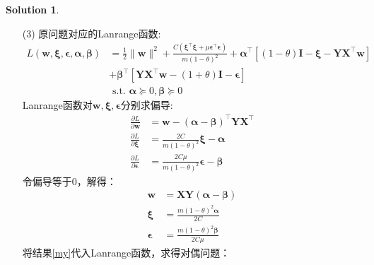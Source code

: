 \documentclass[a4paper,UTF8]{article}
\numberwithin{equation}{section}
\theoremstyle{definition}
\newtheorem*{solution}{Solution}
\begin{document}
\begin{solution}
\begin{enumerate}
        \item [(3)]
        原问题对应的Lanrange函数: \\
        \begin{equation}
            \begin{aligned}
                L(\boldsymbol{w}, \boldsymbol{\xi}, \boldsymbol{\epsilon}, \boldsymbol{\alpha}, \boldsymbol{\beta}) &=\frac{1}{2}\|\boldsymbol{w}\|^{2}+\frac{C\left(\boldsymbol{\xi}^{\top} \boldsymbol{\xi}+\mu \boldsymbol{\epsilon}^{\top} \boldsymbol{\epsilon}\right)}{m(1-\theta)^{2}}+\boldsymbol{\alpha}^{\top}\left[(1-\theta) \mathbf{I}-\boldsymbol{\xi}-\boldsymbol{Y} \boldsymbol{X}^{\top} \boldsymbol{w}\right] \\ &+\boldsymbol{\beta}^{\top}\left[\boldsymbol{Y} \boldsymbol{X}^{\top} \boldsymbol{w}-(1+\theta) \mathbf{I}-\boldsymbol{\epsilon}\right] \\ &\text{ s.t. } \boldsymbol{\alpha} \succeq 0, \boldsymbol{\beta} \succeq 0
            \end{aligned}
        \end{equation}
        Lanrange函数对$\boldsymbol{w}, \boldsymbol{\xi}, \boldsymbol{\epsilon}$分别求偏导: \\
        \begin{equation}
            \begin{aligned} \frac{\partial L}{\partial \boldsymbol{w}} & =\boldsymbol{w}-(\boldsymbol{\alpha}-\boldsymbol{\beta})^{\top} \boldsymbol{Y} \boldsymbol{X}^{\top} \\ \frac{\partial L}{\partial \boldsymbol{\xi}} & =\frac{2 C}{m(1-\theta)^{2}} \boldsymbol{\xi}-\boldsymbol{\alpha} \\ \frac{\partial L}{\partial \boldsymbol{\epsilon}} & =\frac{2 C \mu}{m(1-\theta)^{2}} \boldsymbol{\epsilon}-\boldsymbol{\beta}\end{aligned}
        \end{equation}
        令偏导等于0，解得：
        \begin{equation}
            \begin{aligned} \boldsymbol{w} & =\boldsymbol{X} \boldsymbol{Y}(\boldsymbol{\alpha}-\boldsymbol{\beta}) \\ \boldsymbol{\xi} & =\frac{m(1-\theta)^{2} \boldsymbol{\alpha}}{2 C} \\ \boldsymbol{\epsilon} & =\frac{m(1-\theta)^{2} \boldsymbol{\beta}}{2 C \mu}\end{aligned} \label{my}
        \end{equation}
        将结果\ref*{my}代入Lanrange函数，求得对偶问题：

\end{enumerate}
\end{solution}
\end{document}

